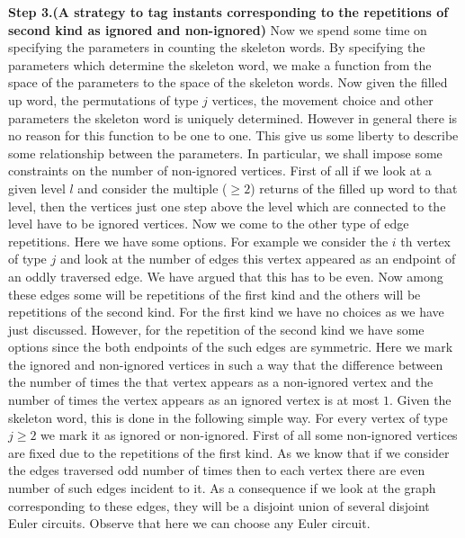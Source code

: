 \documentclass[12pt]{article}
\numberwithin{equation}{section}
\numberwithin{equation}{section}
\theoremstyle{definition}
\renewcommand{\1}{\bf 1}
\begin{document}

\noindent
\textbf{Step 3.(A strategy to tag instants corresponding to the repetitions of second kind as ignored and non-ignored)} Now we spend some time on specifying the parameters in counting the skeleton words. By specifying the parameters which determine the skeleton word, we make a function from the space of the parameters to the space of the skeleton words. Now given the filled up word, the permutations of type $j$ vertices, the movement choice and other parameters the skeleton word is uniquely determined. However in general there is no reason for this function to be one to one. This give us some liberty to describe some relationship between the parameters. In particular, we shall impose some constraints on the number of non-ignored vertices. First of all if we look at a given level $l$ and consider the multiple ($\ge 2$) returns of the filled up word to that level, then the vertices just one step above the level which are connected to the level have to be ignored vertices. Now we come to the other type of edge repetitions. Here we have some options. For example we consider the $i$ th vertex of type $j$ and look at the number of edges this vertex appeared as an endpoint of an oddly traversed edge. We have argued that this has to be even. Now among these edges some will be repetitions of the first kind and the others will be repetitions of the second kind. For the first kind we have no choices as we have just discussed. However, for the repetition of the second kind we have some options since the both endpoints of the such edges are symmetric. Here we mark the ignored and non-ignored  vertices in such a way that the difference between the number of times the that vertex appears as a non-ignored vertex and the number of times the vertex appears as an ignored vertex is at most $1$. Given the skeleton word, this is done in the following simple way. For every vertex of type $j\ge 2$ we mark it as ignored or non-ignored. First of all some non-ignored vertices are fixed due to the repetitions of the first kind.
As we know that if we consider the edges traversed odd number of times then to each vertex there are even number of such edges incident to it. As a consequence if we look at the graph corresponding to these edges, they will be a disjoint union of several disjoint Euler circuits. Observe that here we can choose any Euler circuit.
\end{document}

